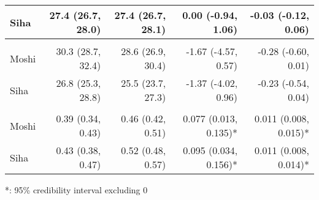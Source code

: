 \begin{table}[t]
\begin{tabular*}{\linewidth}{@{\extracolsep{\fill}}l|rrrr}
Siha & 27.4 (26.7, 28.0) & 27.4 (26.7, 28.1) & 0.00 (-0.94, 1.06)  & -0.03 (-0.12, 0.06)  \\ 
\midrule\addlinespace[2.5pt]
\multicolumn{5}{l}{UTCI} \\[2.5pt] 
\midrule\addlinespace[2.5pt]
Moshi & 30.3 (28.7, 32.4) & 28.6 (26.9, 30.4) & -1.67 (-4.57, 0.57)  & -0.28 (-0.60, 0.01)  \\ 
Siha & 26.8 (25.3, 28.8) & 25.5 (23.7, 27.3) & -1.37 (-4.02, 0.96)  & -0.23 (-0.54, 0.04)  \\ 
\midrule\addlinespace[2.5pt]
\multicolumn{5}{l}{Greenness (NDVI)} \\[2.5pt] 
\midrule\addlinespace[2.5pt]
Moshi & 0.39 (0.34, 0.43) & 0.46 (0.42, 0.51) & 0.077 (0.013, 0.135)* & 0.011 (0.008, 0.015)* \\ 
Siha & 0.43 (0.38, 0.47) & 0.52 (0.48, 0.57) & 0.095 (0.034, 0.156)* & 0.011 (0.008, 0.014)* \\ 
\bottomrule
\end{tabular*}
\begin{minipage}{\linewidth}
*: 95\% credibility interval excluding 0\\
\end{minipage}
\end{table}

